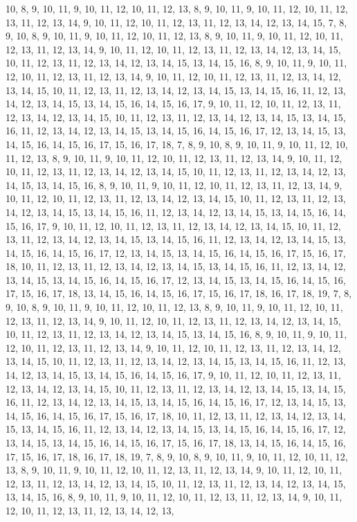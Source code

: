 \begin{DoxyCompactItemize}
10, 8, 9, 10, 11, 9, 10, 11, 12, 10, 11, 12, 13, 8, 9, 10, 11, 9, 10, 11, 12, 10, 11, 12, 13, 11, 12, 13, 14, 9, 10, 11, 12, 10, 11, 12, 13, 11, 12, 13, 14, 12, 13, 14, 15, 7, 8, 9, 10, 8, 9, 10, 11, 9, 10, 11, 12, 10, 11, 12, 13, 8, 9, 10, 11, 9, 10, 11, 12, 10, 11, 12, 13, 11, 12, 13, 14, 9, 10, 11, 12, 10, 11, 12, 13, 11, 12, 13, 14, 12, 13, 14, 15, 10, 11, 12, 13, 11, 12, 13, 14, 12, 13, 14, 15, 13, 14, 15, 16, 8, 9, 10, 11, 9, 10, 11, 12, 10, 11, 12, 13, 11, 12, 13, 14, 9, 10, 11, 12, 10, 11, 12, 13, 11, 12, 13, 14, 12, 13, 14, 15, 10, 11, 12, 13, 11, 12, 13, 14, 12, 13, 14, 15, 13, 14, 15, 16, 11, 12, 13, 14, 12, 13, 14, 15, 13, 14, 15, 16, 14, 15, 16, 17, 9, 10, 11, 12, 10, 11, 12, 13, 11, 12, 13, 14, 12, 13, 14, 15, 10, 11, 12, 13, 11, 12, 13, 14, 12, 13, 14, 15, 13, 14, 15, 16, 11, 12, 13, 14, 12, 13, 14, 15, 13, 14, 15, 16, 14, 15, 16, 17, 12, 13, 14, 15, 13, 14, 15, 16, 14, 15, 16, 17, 15, 16, 17, 18, 7, 8, 9, 10, 8, 9, 10, 11, 9, 10, 11, 12, 10, 11, 12, 13, 8, 9, 10, 11, 9, 10, 11, 12, 10, 11, 12, 13, 11, 12, 13, 14, 9, 10, 11, 12, 10, 11, 12, 13, 11, 12, 13, 14, 12, 13, 14, 15, 10, 11, 12, 13, 11, 12, 13, 14, 12, 13, 14, 15, 13, 14, 15, 16, 8, 9, 10, 11, 9, 10, 11, 12, 10, 11, 12, 13, 11, 12, 13, 14, 9, 10, 11, 12, 10, 11, 12, 13, 11, 12, 13, 14, 12, 13, 14, 15, 10, 11, 12, 13, 11, 12, 13, 14, 12, 13, 14, 15, 13, 14, 15, 16, 11, 12, 13, 14, 12, 13, 14, 15, 13, 14, 15, 16, 14, 15, 16, 17, 9, 10, 11, 12, 10, 11, 12, 13, 11, 12, 13, 14, 12, 13, 14, 15, 10, 11, 12, 13, 11, 12, 13, 14, 12, 13, 14, 15, 13, 14, 15, 16, 11, 12, 13, 14, 12, 13, 14, 15, 13, 14, 15, 16, 14, 15, 16, 17, 12, 13, 14, 15, 13, 14, 15, 16, 14, 15, 16, 17, 15, 16, 17, 18, 10, 11, 12, 13, 11, 12, 13, 14, 12, 13, 14, 15, 13, 14, 15, 16, 11, 12, 13, 14, 12, 13, 14, 15, 13, 14, 15, 16, 14, 15, 16, 17, 12, 13, 14, 15, 13, 14, 15, 16, 14, 15, 16, 17, 15, 16, 17, 18, 13, 14, 15, 16, 14, 15, 16, 17, 15, 16, 17, 18, 16, 17, 18, 19, 7, 8, 9, 10, 8, 9, 10, 11, 9, 10, 11, 12, 10, 11, 12, 13, 8, 9, 10, 11, 9, 10, 11, 12, 10, 11, 12, 13, 11, 12, 13, 14, 9, 10, 11, 12, 10, 11, 12, 13, 11, 12, 13, 14, 12, 13, 14, 15, 10, 11, 12, 13, 11, 12, 13, 14, 12, 13, 14, 15, 13, 14, 15, 16, 8, 9, 10, 11, 9, 10, 11, 12, 10, 11, 12, 13, 11, 12, 13, 14, 9, 10, 11, 12, 10, 11, 12, 13, 11, 12, 13, 14, 12, 13, 14, 15, 10, 11, 12, 13, 11, 12, 13, 14, 12, 13, 14, 15, 13, 14, 15, 16, 11, 12, 13, 14, 12, 13, 14, 15, 13, 14, 15, 16, 14, 15, 16, 17, 9, 10, 11, 12, 10, 11, 12, 13, 11, 12, 13, 14, 12, 13, 14, 15, 10, 11, 12, 13, 11, 12, 13, 14, 12, 13, 14, 15, 13, 14, 15, 16, 11, 12, 13, 14, 12, 13, 14, 15, 13, 14, 15, 16, 14, 15, 16, 17, 12, 13, 14, 15, 13, 14, 15, 16, 14, 15, 16, 17, 15, 16, 17, 18, 10, 11, 12, 13, 11, 12, 13, 14, 12, 13, 14, 15, 13, 14, 15, 16, 11, 12, 13, 14, 12, 13, 14, 15, 13, 14, 15, 16, 14, 15, 16, 17, 12, 13, 14, 15, 13, 14, 15, 16, 14, 15, 16, 17, 15, 16, 17, 18, 13, 14, 15, 16, 14, 15, 16, 17, 15, 16, 17, 18, 16, 17, 18, 19, 7, 8, 9, 10, 8, 9, 10, 11, 9, 10, 11, 12, 10, 11, 12, 13, 8, 9, 10, 11, 9, 10, 11, 12, 10, 11, 12, 13, 11, 12, 13, 14, 9, 10, 11, 12, 10, 11, 12, 13, 11, 12, 13, 14, 12, 13, 14, 15, 10, 11, 12, 13, 11, 12, 13, 14, 12, 13, 14, 15, 13, 14, 15, 16, 8, 9, 10, 11, 9, 10, 11, 12, 10, 11, 12, 13, 11, 12, 13, 14, 9, 10, 11, 12, 10, 11, 12, 13, 11, 12, 13, 14, 12, 13, 
\end{DoxyCompactItemize}
